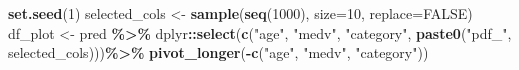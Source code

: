 \documentclass[
]{article}
\newenvironment{Shaded}{\begin{snugshade}}{\end{snugshade}}
\newcommand{\AttributeTok}[1]{\textcolor[rgb]{0.13,0.29,0.53}{#1}}
\newcommand{\ConstantTok}[1]{\textcolor[rgb]{0.56,0.35,0.01}{#1}}
\newcommand{\DecValTok}[1]{\textcolor[rgb]{0.00,0.00,0.81}{#1}}
\newcommand{\FunctionTok}[1]{\textcolor[rgb]{0.13,0.29,0.53}{\textbf{#1}}}
\newcommand{\NormalTok}[1]{#1}
\newcommand{\OtherTok}[1]{\textcolor[rgb]{0.56,0.35,0.01}{#1}}
\newcommand{\SpecialCharTok}[1]{\textcolor[rgb]{0.81,0.36,0.00}{\textbf{#1}}}
\newcommand{\StringTok}[1]{\textcolor[rgb]{0.31,0.60,0.02}{#1}}
\begin{document}
\begin{Shaded}
\begin{Highlighting}[]
\FunctionTok{set.seed}\NormalTok{(}\DecValTok{1}\NormalTok{)}
\NormalTok{selected\_cols }\OtherTok{\textless{}{-}} \FunctionTok{sample}\NormalTok{(}\FunctionTok{seq}\NormalTok{(}\DecValTok{1000}\NormalTok{), }\AttributeTok{size=}\DecValTok{10}\NormalTok{, }\AttributeTok{replace=}\ConstantTok{FALSE}\NormalTok{)}
\NormalTok{df\_plot }\OtherTok{\textless{}{-}}\NormalTok{ pred }\SpecialCharTok{\%\textgreater{}\%}
\NormalTok{  dplyr}\SpecialCharTok{::}\FunctionTok{select}\NormalTok{(}\FunctionTok{c}\NormalTok{(}\StringTok{"age"}\NormalTok{, }\StringTok{"medv"}\NormalTok{, }\StringTok{"category"}\NormalTok{, }
                  \FunctionTok{paste0}\NormalTok{(}\StringTok{"pdf\_"}\NormalTok{, selected\_cols)))}\SpecialCharTok{\%\textgreater{}\%}
  \FunctionTok{pivot\_longer}\NormalTok{(}\SpecialCharTok{{-}}\FunctionTok{c}\NormalTok{(}\StringTok{"age"}\NormalTok{, }\StringTok{"medv"}\NormalTok{, }\StringTok{"category"}\NormalTok{))}



\end{Highlighting}
\end{Shaded}
\end{document}
